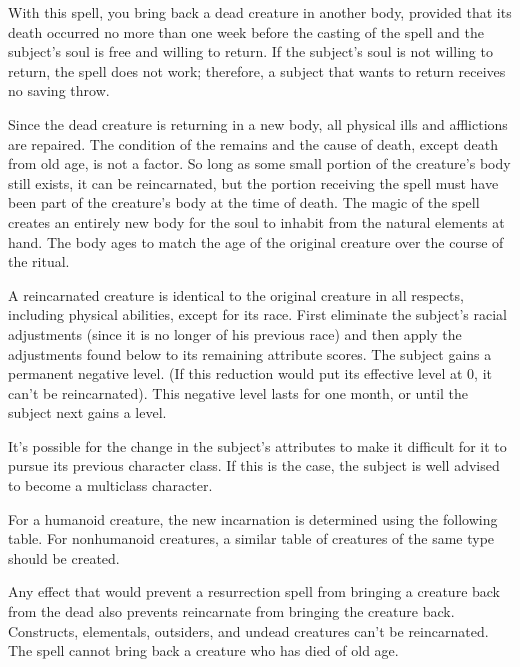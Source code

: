\begin{spelleffect}
With this spell, you bring back a dead creature in another body, provided that its death occurred no more than one week before the casting of the spell and the subject's soul is free and willing to return. If the subject's soul is not willing to return, the spell does not work; therefore, a subject that wants to return receives no saving throw.
\par Since the dead creature is returning in a new body, all physical ills and afflictions are repaired. The condition of the remains and the cause of death, except death from old age, is not a factor. So long as some small portion of the creature's body still exists, it can be reincarnated, but the portion receiving the spell must have been part of the creature's body at the time of death. The magic of the spell creates an entirely new body for the soul to inhabit from the natural elements at hand. The body ages to match the age of the original creature over the course of the ritual.
\par A reincarnated creature is identical to the original creature in all respects, including physical abilities, except for its race. First eliminate the subject's racial adjustments (since it is no longer of his previous race) and then apply the adjustments found below to its remaining attribute scores. The subject gains a permanent negative level. (If this reduction would put its effective level at 0, it can't be reincarnated). This negative level lasts for one month, or until the subject next gains a level.
\par It's possible for the change in the subject's attributes to make it difficult for it to pursue its previous character class. If this is the case, the subject is well advised to become a multiclass character.
\par For a humanoid creature, the new incarnation is determined using the following table. For nonhumanoid creatures, a similar table of creatures of the same type should be created.
\par Any effect that would prevent a resurrection spell from bringing a creature back from the dead also prevents reincarnate from bringing the creature back. Constructs, elementals, outsiders, and undead creatures can't be reincarnated. The spell cannot bring back a creature who has died of old age.

\end{spelleffect}
